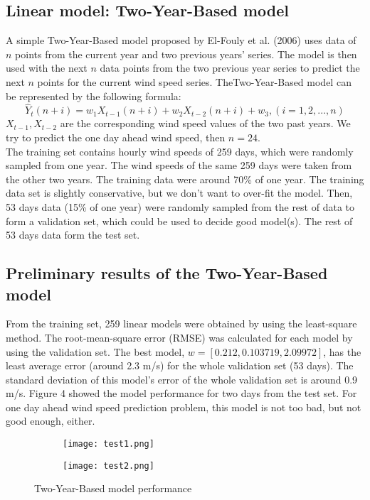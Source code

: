 \documentclass{article}
\begin{document}
\subsection*{Linear model: Two-Year-Based model}
A simple Two-Year-Based model proposed by El-Fouly et al. (2006) uses data of  $n$ points from the
current year and two previous years’ series.  The model is then used with the next $n$ data points from the two previous year series to predict the next  $n$ points for the current wind speed series. TheTwo-Year-Based model can be represented by the following formula: \\

\begin{equation*}
\hat{Y}_t (n+i) = w_1X_{t-1}(n+i) + w_2 X_{t-2}(n+i) +w_3, (i = 1, 2, ... , n)
\end{equation*}
$X_{t-1}, X_{t-2}$ are the corresponding wind speed values of the two past years. We try to predict the one day ahead wind speed, then $n=24$. \\
The training set contains hourly wind speeds of 259 days, which were randomly sampled from one year.  The wind speeds of the same 259 days were taken from the other two years. The training data were around 70\%   of one year.  The training data set is slightly conservative, but we don't want to over-fit the model.  Then, 53 days data (15\% of one year) were randomly sampled from the rest of data to form a validation set, which could be used to decide good model(s).  The rest of 53 days data form the test set.\\

\subsection*{Preliminary results of the Two-Year-Based model}
From the training set, 259 linear models were obtained by using the least-square method.  The root-mean-square error (RMSE) was calculated for each model by using the validation set.  The best model, $w=[0.212, 0.103719, 2.09972]$, has the least average error (around 2.3 m/s) for the whole validation set (53 days).  The standard deviation of this model's error of the whole validation set is around 0.9 m/s.  Figure 4 showed the model performance for two days from the test set.  For one day ahead wind speed prediction problem, this model is not too bad, but not good enough, either.

\begin{figure}[h]
  \begin{subfigure}[b]{0.5\textwidth}
    \texttt{[image: test1.png]}
    \caption{} 
    \label{fig:f1}
  \end{subfigure}
  \hfill
  \begin{subfigure}[b]{0.5\textwidth}
    \texttt{[image: test2.png]}
    \caption{}
    \label{fig:f2}
  \end{subfigure}
  \caption{Two-Year-Based model performance}
\end{figure}
\end{document}

